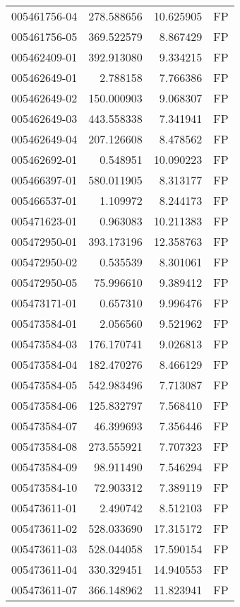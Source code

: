 \begin{tabular}{lrrl}
005461756-04 &  278.588656 &    10.625905 &   FP \\
005461756-05 &  369.522579 &     8.867429 &   FP \\
005462409-01 &  392.913080 &     9.334215 &   FP \\
005462649-01 &    2.788158 &     7.766386 &   FP \\
005462649-02 &  150.000903 &     9.068307 &   FP \\
005462649-03 &  443.558338 &     7.341941 &   FP \\
005462649-04 &  207.126608 &     8.478562 &   FP \\
005462692-01 &    0.548951 &    10.090223 &   FP \\
005466397-01 &  580.011905 &     8.313177 &   FP \\
005466537-01 &    1.109972 &     8.244173 &   FP \\
005471623-01 &    0.963083 &    10.211383 &   FP \\
005472950-01 &  393.173196 &    12.358763 &   FP \\
005472950-02 &    0.535539 &     8.301061 &   FP \\
005472950-05 &   75.996610 &     9.389412 &   FP \\
005473171-01 &    0.657310 &     9.996476 &   FP \\
005473584-01 &    2.056560 &     9.521962 &   FP \\
005473584-03 &  176.170741 &     9.026813 &   FP \\
005473584-04 &  182.470276 &     8.466129 &   FP \\
005473584-05 &  542.983496 &     7.713087 &   FP \\
005473584-06 &  125.832797 &     7.568410 &   FP \\
005473584-07 &   46.399693 &     7.356446 &   FP \\
005473584-08 &  273.555921 &     7.707323 &   FP \\
005473584-09 &   98.911490 &     7.546294 &   FP \\
005473584-10 &   72.903312 &     7.389119 &   FP \\
005473611-01 &    2.490742 &     8.512103 &   FP \\
005473611-02 &  528.033690 &    17.315172 &   FP \\
005473611-03 &  528.044058 &    17.590154 &   FP \\
005473611-04 &  330.329451 &    14.940553 &   FP \\
005473611-07 &  366.148962 &    11.823941 &   FP \\

\end{tabular}
